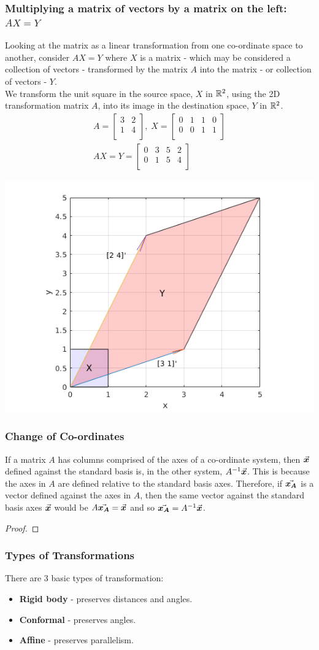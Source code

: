 \documentclass[MathsNotesBase.tex]{subfiles}
\newcommand{\exampleMatrixTwoDTransform}{
We transform the unit square in the source space, $X$ in $\R{2}$, using the 2D transformation matrix $A$, into its image in the destination space, $Y$ in $\R{2}$.
	\begin{align*}
	A =
	\begin{bmatrix}    
	3  &   2 \\
	1  &   4 \\		
	\end{bmatrix}
	,\; X = 
	\begin{bmatrix}  
	0   &  1  &   1  &   0 \\
	0   &  0  &   1  &   1	\\	
	\end{bmatrix} \\[10pt]
	AX = Y = 
	\begin{bmatrix}   
	0  &   3  &   5  &   2 \\
	0  &   1  &   5  &   4	\\
	\end{bmatrix}
	\end{align*}
	
	\begin{center}
	\includegraphics[scale=0.85]{resources/img/GeometryOfMatrices_images/linear_transformation.png}
	\end{center}
}
\begin{document}
{		\subsubsection{Multiplying a matrix of vectors by a matrix on the left: $ AX = Y $}
		Looking at the matrix as a linear transformation from one co-ordinate space to another, consider $AX = Y$ where $X$ is a matrix - which may be considered a collection of vectors - transformed by the matrix $A$ into the matrix - or collection of vectors - $Y$.\\
					
		\exampleMatrixTwoDTransform
		
		\bigskip
		\subsubsection{Change of Co-ordinates}
		If a matrix $A$ has columns comprised of the axes of a co-ordinate system, then $\vec{\bm{x}}$ defined against the standard basis is, in the other system, ${ {A}^{-1}\vec{\bm{x}} }$. This is because the axes in $A$ are defined relative to the standard basis axes. Therefore, if $\vec{\bm{x_A}}$ is a vector defined against the axes in $A$, then the same vector against the standard basis axes $\vec{\bm{x}}$ would be ${ A\vec{\bm{x_A}} = \vec{\bm{x}} }$ and so ${ \vec{\bm{x_A}} = {A}^{-1}\vec{\bm{x}} }$.
		
		\medskip
		\begin{proof}
		\end{proof}
		
		\bigskip
		\subsubsection{Types of Transformations}
		There are 3 basic types of transformation:
		\begin{itemize}
		\item{\textbf{Rigid body} - preserves distances and angles.
		}
		\item{\textbf{Conformal} - preserves angles.
		}
		\item{\textbf{Affine} - preserves parallelism.
		}
		\end{itemize}
		
}
\end{document}

